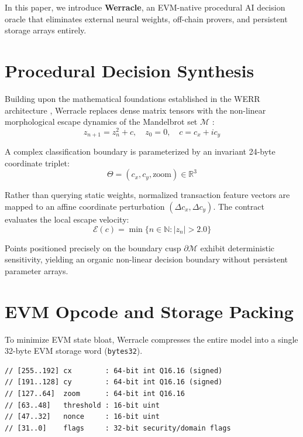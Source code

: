 \documentclass[10pt,twocolumn]{article}
\begin{document}
In this paper, we introduce \textbf{Werracle}, an EVM-native procedural AI decision oracle that eliminates external neural weights, off-chain provers, and persistent storage arrays entirely.

\section{Procedural Decision Synthesis}
Building upon the mathematical foundations established in the WERR architecture \cite{dargli2026universal, dargli2026mandelbrot}, Werracle replaces dense matrix tensors with the non-linear morphological escape dynamics of the Mandelbrot set $\mathcal{M}$ \cite{mandelbrot1982fractal}:
\begin{equation}
z_{n+1} = z_n^2 + c, \quad z_0 = 0, \quad c = c_x + i c_y
\end{equation}

A complex classification boundary is parameterized by an invariant 24-byte coordinate triplet:
\begin{equation}
\Theta = (c_x, c_y, \text{zoom}) \in \mathbb{R}^3
\end{equation}

Rather than querying static weights, normalized transaction feature vectors are mapped to an affine coordinate perturbation $(\Delta c_x, \Delta c_y)$. The contract evaluates the local escape velocity:
\begin{equation}
\mathcal{E}(c) = \min \{ n \in \mathbb{N} : |z_n| > 2.0 \}
\end{equation}

Points positioned precisely on the boundary cusp $\partial \mathcal{M}$ exhibit deterministic sensitivity, yielding an organic non-linear decision boundary without persistent parameter arrays.

\section{EVM Opcode and Storage Packing}
To minimize EVM state bloat, Werracle compresses the entire model into a single 32-byte EVM storage word (\texttt{bytes32}).

\begin{lstlisting}[language=Solidity, caption={Bit-Level Storage Packing of bytes32 Slot}]
// [255..192] cx        : 64-bit int Q16.16 (signed)
// [191..128] cy        : 64-bit int Q16.16 (signed)
// [127..64]  zoom      : 64-bit int Q16.16
// [63..48]   threshold : 16-bit uint
// [47..32]   nonce     : 16-bit uint
// [31..0]    flags     : 32-bit security/domain flags
\end{lstlisting}
\end{document}
